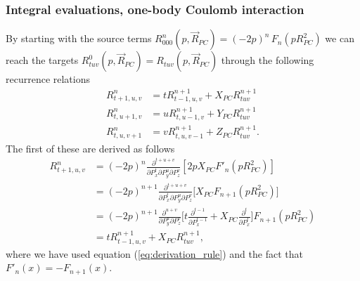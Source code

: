\frame
{
  \frametitle{Integral evaluations, one-body Coulomb interaction}
\begin{small}
{\scriptsize
By starting with the source terms $R^n_{000}(p,\vec R_{PC}) = (-2p)^n\,F_n(p R^2_{PC})$ we can reach the targets $R^0_{tuv}(p,\vec R_{PC}) = R_{tuv}(p,\vec R_{PC})$ through the following
recurrence relations
\begin{equation}
\label{eq:R_recurrence}
 \begin{split}
  R^n_{t+1,u,v} & = tR^{n+1}_{t-1,u,v} + X_{PC} R^{n+1}_{tuv} \\
  R^n_{t,u+1,v} & = uR^{n+1}_{t,u-1,v} + Y_{PC} R^{n+1}_{tuv} \\
  R^n_{t,u,v+1} & = vR^{n+1}_{t,u,v-1} + Z_{PC} R^{n+1}_{tuv}.
 \end{split}
\end{equation}
The first of these are derived as follows
\begin{align}
 R^{n}_{t+1,u,v} & = (-2p)^n\frac{\partial^{t+u+v}}{\partial P_x^t \partial P_y^u \partial P_z^v} [2pX_{PC}F'_n(pR_{PC}^2)] \\
                 & = (-2p)^{n+1}\frac{\partial^{t+u+v}}{\partial P_x^t\partial P_y^u \partial P_z^v}\Big[X_{PC}F_{n+1}(pR_{PC}^2)\Big] \\
                 & = (-2p)^{n+1}\frac{\partial^{u+v}}{\partial P_y^u \partial P_z^v}\Big[t\frac{\partial^{t-1}}{\partial P_x^{t-1}} + X_{PC}\frac{\partial^t}{\partial P_x^t}\Big]F_{n+1}(pR_{PC}^2) \\
                 & = tR^{n+1}_{t-1,u,v} + X_{PC}R^{n+1}_{tuv},
\end{align}
where we have used equation (\ref{eq:derivation_rule}) and the fact that $F'_n(x) = -F_{n+1}(x)$.
}
\end{small}
}



